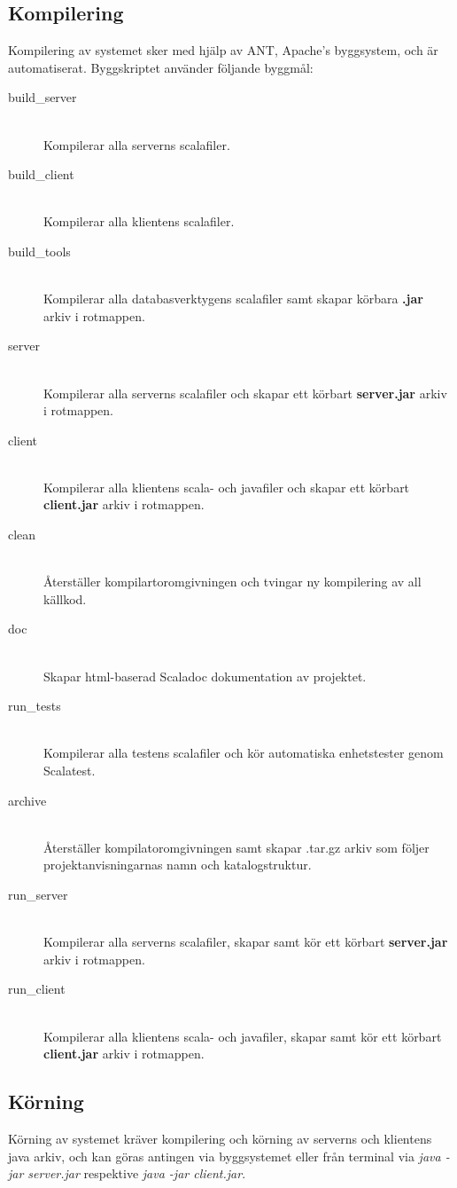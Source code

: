 \documentclass[a4paper]{article}
\begin{document}
\subsection{Kompilering}
Kompilering av systemet sker med hjälp av ANT, Apache's byggsystem, och är automatiserat. Byggskriptet använder följande byggmål:
\begin{description}
\item[build\_server] \hfill \\ Kompilerar alla serverns scalafiler.
\item[build\_client] \hfill \\ Kompilerar alla klientens scalafiler.
\item[build\_tools] \hfill \\ Kompilerar alla databasverktygens scalafiler samt skapar körbara \textbf{.jar} arkiv i rotmappen.
\item[server] \hfill \\ Kompilerar alla serverns scalafiler och skapar ett körbart \textbf{server.jar} arkiv i rotmappen.
\item[client] \hfill \\ Kompilerar alla klientens scala- och javafiler och skapar ett körbart \textbf{client.jar} arkiv i rotmappen.
\item[clean] \hfill \\ Återställer kompilartoromgivningen och tvingar ny kompilering av all källkod.
\item[doc] \hfill \\ Skapar html-baserad Scaladoc dokumentation av projektet.
\item[run\_tests] \hfill \\ Kompilerar alla testens scalafiler och kör automatiska enhetstester genom Scalatest.
\item[archive] \hfill \\ Återställer kompilatoromgivningen samt skapar .tar.gz arkiv som följer projektanvisningarnas namn och katalogstruktur.
\item[run\_server] \hfill \\ Kompilerar alla serverns scalafiler, skapar samt kör ett körbart \textbf{server.jar} arkiv i rotmappen.
\item[run\_client] \hfill \\ Kompilerar alla klientens scala- och javafiler, skapar samt kör ett körbart \textbf{client.jar} arkiv i rotmappen.
\end{description}

\subsection{Körning}
Körning av systemet kräver kompilering och körning av serverns och klientens java arkiv, och kan göras antingen via byggsystemet
eller från terminal via \textit{java -jar server.jar} respektive  \textit{java -jar client.jar}.
\end{document}
